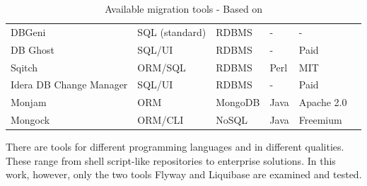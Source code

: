 \pagebreak
\begin{table}[H]
	\centering
	\begin{tabularx}{14cm}{p{3cm} p{3cm} p{2cm} l l p{2cm} }
				DBGeni & SQL (standard) & RDBMS & - & -\\
				DB Ghost & SQL/UI & RDBMS & - & Paid\\
				Sqitch & ORM/SQL & RDBMS & Perl & MIT \\
				Idera DB Change Manager & SQL/UI & RDBMS & - & Paid\\
				Monjam & ORM & MongoDB & Java & Apache 2.0\\
				Mongock & ORM/CLI & NoSQL & Java & Freemium\\
		\bottomrule
	\end{tabularx}
	\caption{Available migration tools - Based on \cite{GoogleCloudTools, DBMSTools}}
	\label{tab:migration_tools}
\end{table}

There are tools for different programming languages and in different qualities. These range from shell script-like repositories to enterprise solutions. In this work, however, only the two tools Flyway and Liquibase are examined and tested.





